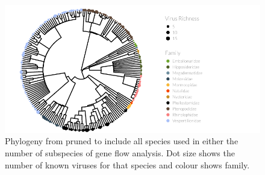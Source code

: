 
































\begin{knitrout}\footnotesize
{}\color{fgcolor}\begin{figure}[t]

{\centering \includegraphics[width=1.2\textwidth]{figure/treePlot-1} 

}

\caption[Pruned phylogeny with dot size showing number of pathogens and colour showing family.]{
Phylogeny from \cite{bininda2007delayed} pruned to include all species used in either the number of subspecies of gene flow analysis.
Dot size shows the number of known viruses for that species and colour shows family.
}\label{fig:treePlot}
\end{figure}


\end{knitrout}

